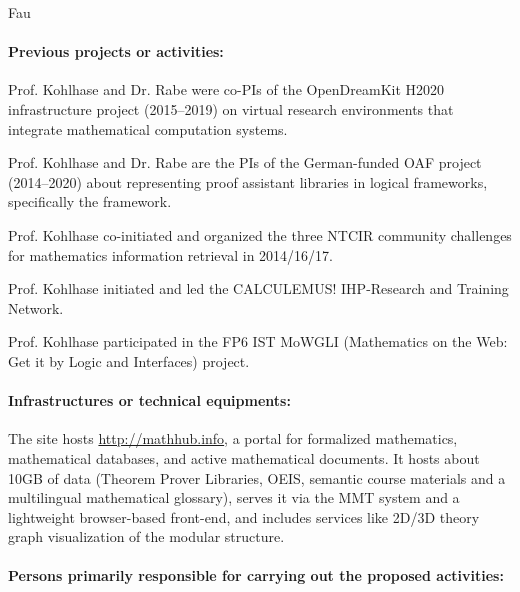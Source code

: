 \begin{sitedescription}{Fau}
\paragraph*{Previous projects or activities:}


\begin{compactitem}
 \item Prof. Kohlhase and Dr. Rabe were co-PIs of the OpenDreamKit H2020 infrastructure project (2015--2019) on virtual research environments that integrate mathematical computation systems.
 \item Prof. Kohlhase and Dr. Rabe are the PIs of the German-funded OAF project (2014--2020) about representing proof assistant libraries in logical frameworks, specifically the \mmt framework.
 \item Prof. Kohlhase co-initiated and organized the three NTCIR community challenges for mathematics information retrieval in 2014/16/17.
 \item Prof. Kohlhase initiated and led the CALCULEMUS! IHP-Research and Training Network.
 \item Prof. Kohlhase participated in the FP6 IST MoWGLI (Mathematics on the Web: Get it by Logic and Interfaces) project.
\end{compactitem}

\paragraph*{Infrastructures or technical equipments:}

The site hosts \url{http://mathhub.info}, a portal for formalized mathematics, mathematical databases, and active mathematical documents.
It hosts about 10GB of data (Theorem Prover Libraries, OEIS, semantic course materials and a multilingual mathematical glossary), serves it via the MMT system and a lightweight browser-based front-end, and includes services like 2D/3D theory graph visualization of the modular structure.

\paragraph*{Persons primarily responsible for carrying out the proposed activities:}


\end{sitedescription}
